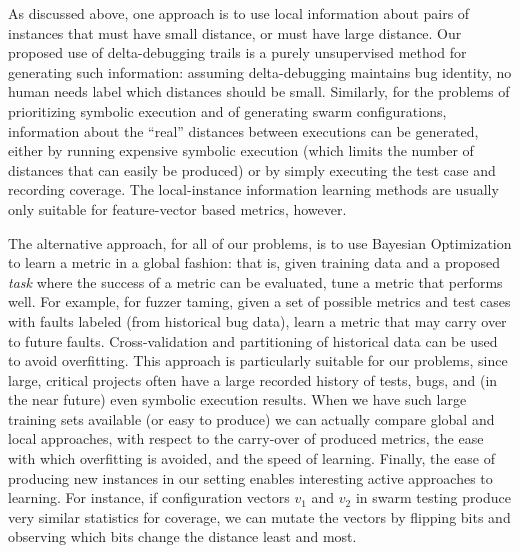 As discussed above, one approach is to use local information about
pairs of instances that must have small distance, or must have large
distance.  Our proposed use of delta-debugging trails is a purely
unsupervised method for generating such information: assuming
delta-debugging maintains bug identity, no human needs label which
distances should be small.  Similarly, for the problems of
prioritizing symbolic execution and of generating swarm
configurations, information about the ``real'' distances between
executions can be generated, either by running expensive symbolic
execution (which limits the number of distances that can easily be
produced) or by simply executing the test case and recording coverage.
The local-instance information learning methods are usually only
suitable for feature-vector based metrics, however.

The alternative approach, for all of our problems, is to use Bayesian
Optimization to learn a metric in a global fashion: that is, given
training data and a proposed \emph{task} where the success of a metric
can be evaluated, tune a metric that performs well.  For example, for
fuzzer taming, given a set of possible metrics and test cases with
faults labeled (from historical bug data), learn a metric that may
carry over to future faults.  Cross-validation and partitioning of
historical data can be used to avoid overfitting.  This approach is
particularly suitable for our problems, since large, critical projects
often have a large recorded history of tests, bugs, and (in the near
future) even symbolic execution results.  When we have such large
training sets available (or easy to produce) we can actually compare
global and local approaches, with respect to the carry-over of
produced metrics, the ease with which overfitting is avoided, and the
speed of learning.  Finally, the ease of producing new instances in
our setting enables interesting active approaches to learning.  For
instance, if configuration vectors $v_1$ and $v_2$ in swarm testing
produce very similar statistics for coverage, we can mutate the
vectors by flipping bits and observing which bits change the distance
least and most.
